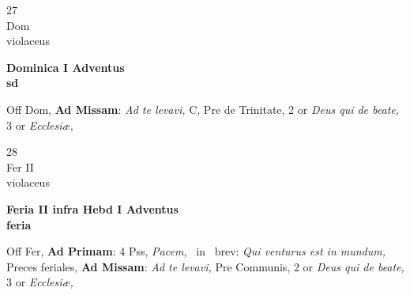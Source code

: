 \documentclass[10pt, openany]{book}
\begin{document}
        \begin{center}
            \begin{minipage}{3.5in}
                \vspace{2em}
                \begin{minipage}{0.5in}
                    {\Huge 27} \\
                    {\normalsize Dom} \\
                    {\normalsize violaceus}
                \end{minipage}
                \begin{minipage}{3.0in}
                    \textbf{ \large Dominica I Adventus \\
                    \textnormal{\normalsize sd}} \\ 
                \end{minipage}
                \begin{justify}Off Dom, \textbf{Ad Missam}: \textit{Ad te levavi,} C, Pre de Trinitate, 2 or \textit{Deus qui de beate,} 3 or \textit{Ecclesiæ,}  
                \end{justify}
            \end{minipage}
        \end{center}
    
        \begin{center}
            \begin{minipage}{3.5in}
                \vspace{2em}
                \begin{minipage}{0.5in}
                    {\Huge 28} \\
                    {\normalsize Fer II} \\
                    {\normalsize violaceus}
                \end{minipage}
                \begin{minipage}{3.0in}
                    \textbf{ \large Feria II infra Hebd I Adventus \\
                    \textnormal{\normalsize feria}} \\ 
                \end{minipage}
                \begin{justify}Off Fer, \textbf{Ad Primam}: 4 Pss, \textit{Pacem,} \Vbar\ in \Rbar\ brev: \textit{Qui venturus est in mundum,} Preces feriales, \textbf{Ad Missam}: \textit{Ad te levavi,} Pre Communis, 2 or \textit{Deus qui de beate,} 3 or \textit{Ecclesiæ,}  
                \end{justify}
            \end{minipage}
        \end{center}
    
\end{document}
